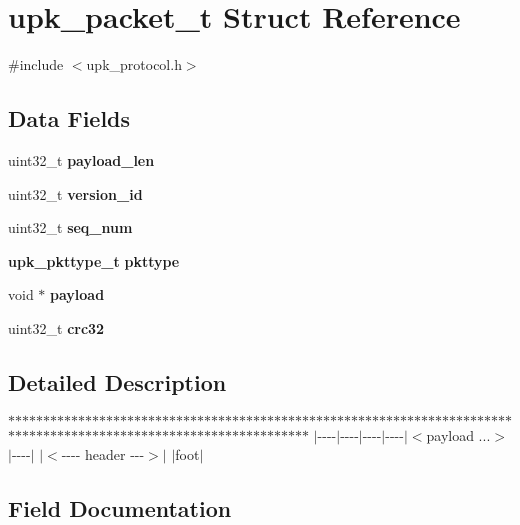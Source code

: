 \section{upk\_\-packet\_\-t Struct Reference}
\label{structupk__packet__t}


{\ttfamily \#include $<$upk\_\-protocol.h$>$}

\subsection*{Data Fields}
\begin{DoxyCompactItemize}
\item 
uint32\_\-t {\bf payload\_\-len}
\item 
uint32\_\-t {\bf version\_\-id}
\item 
uint32\_\-t {\bf seq\_\-num}
\item 
{\bf upk\_\-pkttype\_\-t} {\bf pkttype}
\item 
void $\ast$ {\bf payload}
\item 
uint32\_\-t {\bf crc32}
\end{DoxyCompactItemize}


\subsection{Detailed Description}
$\ast$$\ast$$\ast$$\ast$$\ast$$\ast$$\ast$$\ast$$\ast$$\ast$$\ast$$\ast$$\ast$$\ast$$\ast$$\ast$$\ast$$\ast$$\ast$$\ast$$\ast$$\ast$$\ast$$\ast$$\ast$$\ast$$\ast$$\ast$$\ast$$\ast$$\ast$$\ast$$\ast$$\ast$$\ast$$\ast$$\ast$$\ast$$\ast$$\ast$$\ast$$\ast$$\ast$$\ast$$\ast$$\ast$$\ast$$\ast$$\ast$$\ast$$\ast$$\ast$$\ast$$\ast$$\ast$$\ast$$\ast$$\ast$$\ast$$\ast$$\ast$$\ast$$\ast$$\ast$$\ast$$\ast$$\ast$$\ast$$\ast$$\ast$$\ast$$\ast$$\ast$$\ast$$\ast$$\ast$$\ast$$\ast$$\ast$$\ast$$\ast$$\ast$$\ast$$\ast$$\ast$$\ast$$\ast$$\ast$$\ast$$\ast$$\ast$$\ast$$\ast$$\ast$$\ast$$\ast$$\ast$$\ast$$\ast$$\ast$$\ast$$\ast$$\ast$$\ast$$\ast$$\ast$$\ast$$\ast$$\ast$$\ast$$\ast$$\ast$$\ast$$\ast$$\ast$ $|$-\/-\/-\/-\/$|$-\/-\/-\/-\/$|$-\/-\/-\/-\/$|$-\/-\/-\/-\/$|$$<$payload ...$>$$|$-\/-\/-\/-\/$|$ $|$$<$-\/-\/-\/-\/ header -\/-\/-\/$>$$|$ $|$foot$|$ 

\subsection{Field Documentation}
